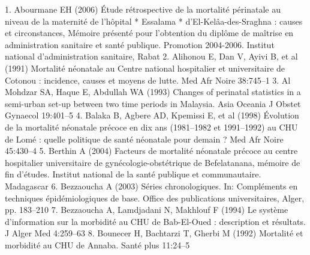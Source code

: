 1. Abourmane EH (2006) Étude rétrospective de la mortalité
périnatale au niveau de la maternité de l’hôpital * Essalama *
d’El-Kelâa-des-Sraghna : causes et circonstances, Mémoire présenté
pour l’obtention du diplôme de maîtrise en administration
sanitaire et santé publique. Promotion 2004-2006. Institut national
d’administration sanitaire, Rabat
2. Alihonou E, Dan V, Ayivi B, et al (1991) Mortalité néonatale au
Centre national hospitalier et universitaire de Cotonou : incidence,
causes et moyens de lutte. Med Afr Noire 38:745–1
3. Al Mohdzar SA, Haque E, Abdullah WA (1993) Changes of
perinatal statistics in a semi-urban set-up between two time
periods in Malaysia. Asia Oceania J Obstet Gynaecol 19:401–5
4. Balaka B, Agbere AD, Kpemissi E, et al (1998) Évolution de la
mortalité néonatale précoce en dix ans (1981–1982 et 1991–1992)
au CHU de Lomé : quelle politique de santé néonatale pour
demain ? Med Afr Noire 45:430–4
5. Berthin A (2004) Facteurs de mortalité néonatale précoce au
centre hospitalier universitaire de gynécologie-obstétrique de
Befelatanana, mémoire de fin d’études. Institut national de la santé
publique et communautaire. Madagascar
6. Bezzaoucha A (2003) Séries chronologiques. In: Compléments en
techniques épidémiologiques de base. Office des publications
universitaires, Alger, pp. 183–210
7. Bezzaoucha A, Lamdjadani N, Makhlouf F (1994) Le système
d’information sur la morbidité au CHU de Bab-El-Oued :
description et résultats. J Alger Med 4:259–63
8. Bounecer H, Bachtarzi T, Gherbi M (1992) Mortalité et morbidité
au CHU de Annaba. Santé plus 11:24–5	
	
